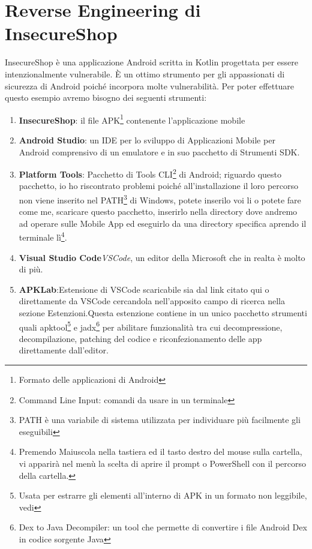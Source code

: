 \documentclass{article}
\begin{document}
\newpage
\section{Reverse Engineering di InsecureShop}
InsecureShop\cite{insecureshop} è una applicazione Android scritta in Kotlin progettata per essere intenzionalmente vulnerabile. 
\`E un ottimo strumento per gli appassionati di sicurezza di Android poiché incorpora molte vulnerabilità.
Per poter effettuare questo esempio avremo bisogno dei seguenti strumenti:
\begin{enumerate}
    \item \textbf{InsecureShop}: il file APK\footnote{Formato delle applicazioni di Android} contenente l'applicazione mobile
    \item \textbf{Android Studio}: un IDE per lo sviluppo di Applicazioni Mobile per Android\cite{androidStudio} 
    comprensivo di un emulatore e in suo pacchetto di Strumenti SDK.
    \item \textbf{Platform Tools}: Pacchetto di Tools CLI\footnote{Command Line Input: comandi da usare in un terminale} 
    di Android; riguardo questo pacchetto, io ho riscontrato problemi poiché
    all'installazione il loro percorso non viene inserito nel PATH\footnote{PATH è una variabile di sistema utilizzata per 
    individuare più facilmente gli eseguibili} di Windows, potete inserilo voi li o potete fare come me, scaricare\cite{sdk} questo pacchetto, 
    inserirlo nella directory dove andremo ad operare sulle Mobile App ed 
    eseguirlo da una directory specifica aprendo il terminale lì\footnote{Premendo Maiuscola nella tastiera ed il tasto destro del mouse sulla cartella, vi apparirà 
    nel menù la scelta di aprire il prompt o PowerShell con il percorso della cartella.}.
    \item \textbf{Visual Studio Code}\cite{vscode}\textit{VSCode}, un editor della Microsoft che in realta è molto di più.
    \item \textbf{APKLab}:Estensione di VSCode scaricabile sia dal link citato qui\cite{apklab} o direttamente da VSCode cercandola nell'apposito 
    campo di ricerca nella sezione Estenzioni.Questa estenzione contiene in un unico pacchetto strumenti quali apktool\footnote{Usata per estrarre gli elementi all'interno 
    di APK in un formato non leggibile, vedi\cite{apktool}} e jadx\footnote{Dex to Java Decompiler: un tool che permette di convertire i file Android Dex 
    in codice sorgente Java\cite{jadx}} per abilitare funzionalità tra cui
    decompressione, decompilazione, patching del codice e riconfezionamento delle app direttamente dall'editor. 
\end{enumerate}
\newpage
\end{document}
